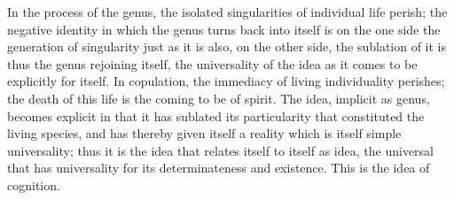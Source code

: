 In the process of the genus,
the isolated singularities of individual life perish;
the negative identity in which the genus turns back into itself is
on the one side the generation of singularity just as it is also,
on the other side, the sublation of it
is thus the genus rejoining itself,
the universality of the idea as it comes to be explicitly for itself.
In copulation, the immediacy of living individuality perishes;
the death of this life is the coming to be of spirit.
The idea, implicit as genus, becomes explicit
in that it has sublated its particularity
that constituted the living species,
and has thereby given itself a reality
which is itself simple universality;
thus it is the idea that relates
itself to itself as idea,
the universal that has universality
for its determinateness and existence.
This is the idea of cognition.
